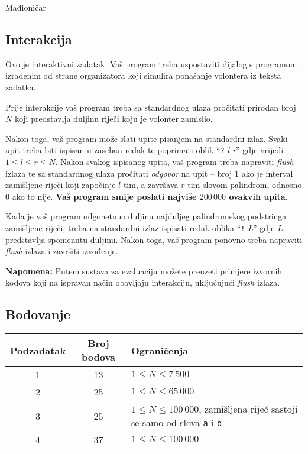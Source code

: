 \begin{statement}[
  problempoints=100,
  timelimit=1 sekunda,
  memorylimit=512 MiB,
]{Mađioničar}
\subsection*{Interakcija}
Ovo je interaktivni zadatak. Vaš program treba uspostaviti dijalog s programom
izrađenim od strane organizatora koji simulira ponašanje volontera iz teksta
zadatka.

Prije interakcije vaš program treba sa standardnog ulaza pročitati
prirodan broj $N$ koji predstavlja duljinu riječi koju je volonter
zamislio.

Nakon toga, vaš program može slati upite pisanjem na standardni izlaz. Svaki
upit treba biti ispisan u zaseban redak te poprimati oblik
``\texttt{?} \textit{l r}''
gdje vrijedi $1 \le l \le r \le N$. Nakon svakog ispisanog upita, vaš program
treba napraviti \textit{flush} izlaza te sa standardnog ulaza pročitati
\textit{odgovor} na upit -- broj $1$ ako je interval zamišljene riječi koji
započinje $l$-tim, a završava $r$-tim slovom palindrom, odnosno $0$ ako to
nije. \textbf{Vaš program smije poslati najviše $200\,000$ ovakvih upita.}

Kada je vaš program odgonetnuo duljinu najduljeg palindromskog podstringa
zamišljene riječi, treba na standardni izlaz ispisati redak oblika
``\texttt{!} \textit{L}'' gdje $L$ predstavlja spomenutu duljinu. Nakon toga,
vaš program ponovno treba napraviti \textit{flush} izlaza i završiti
izvođenje.

\textbf{Napomena:} Putem sustava za evaluaciju možete preuzeti primjere
izvornih kodova koji na ispravan način obavljaju interakciju, uključujući
\textit{flush} izlaza.

\subsection*{Bodovanje}

{\renewcommand{\arraystretch}{1.4}
  \setlength{\tabcolsep}{6pt}
  \begin{tabular}{ccl}
   Podzadatak & Broj bodova & Ograničenja \\ \midrule
    1 & 13 & $1 \leq N \leq 7\,500$ \\
    2 & 25 & $1 \leq N \leq 65\,000$ \\
    3 & 25 & $1 \leq N \leq 100\,000$, zamišljena riječ sastoji se samo od slova \texttt{a} i \texttt{b} \\
    4 & 37 & $1 \leq N \leq 100\,000$ \\
\end{tabular}}


\end{statement}
